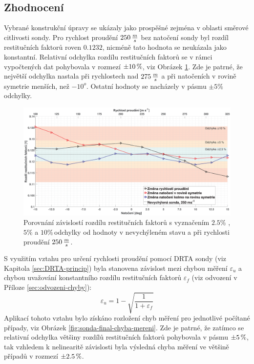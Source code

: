         \newpage
        \subsection{Zhodnocení}

            Vybrané konstrukční úpravy se ukázaly jako prospěšné zejména v oblasti směrové citlivosti sondy. Pro rychlost proudění $250 \, \frac{m}{s}$ bez natočení sondy byl rozdíl restitučních faktorů roven $0.1232$, nicméně tato hodnota se neukázala jako konstantní. Relativní odchylka rozdílu restitučních faktorů se v rámci vypočtených dat pohybovala v rozmezí $\pm10 \, \%$, viz Obrázek \ref{fig:sonda-final-rozdil-restitucnich-faktoru}. Zde je patrné, že největší odchylka nastala při rychlostech nad $275 \, \frac{m}{s}$ a při natočeních v rovině symetrie menších, než $-10^o$. Ostatní hodnoty se nacházely v pásmu $\pm5\%$ odchylky.

            \begin{figure}[ht!]
                \centering
                \includegraphics*[width=\textwidth]{500_FINAL/final_rozdil_restitucnich_faktoru.eps}
                \caption{Porovnání závislostí rozdílu restitučních faktorů s vyznačením $2.5\%$ ,$5\%$ \linebreak a $10\%$\,odchylky od hodnoty v nevychýleném stavu a při rychlosti proudění $250 \, \frac{m}{s}$.}
                \label{fig:sonda-final-rozdil-restitucnich-faktoru}
            \end{figure}

            

            S využitím vztahu pro určení rychlosti proudění pomocí DRTA sondy (viz \linebreak Kapitola \ref{sec:DRTA-princip}) byla stanovena závislost mezi chybou měření $\varepsilon _u$ a chybou uvažování konstantního rozdílu restitučních faktorů $\varepsilon _f$ (viz odvození v Příloze \ref{sec:odvozeni-chyby}):
            \begin{equation} \label{eq:chyba-mereni}
                \varepsilon _u = 1 - \sqrt{\frac{1}{1 + \varepsilon _f}}
            \end{equation}
            Aplikací tohoto vztahu bylo získáno rozložení chyb měření pro jednotlivé počítané případy, viz Obrázek \ref{fig:sonda-final-chyba-mereni}. Zde je patrné, že zatímco se relativní odchylka většiny rozdílů restitučních faktorů pohybovala v pásmu $\pm5 \, \%$, tak vzhledem k nelinearitě závislosti byla výsledná chyba měření ve většině případů v rozmezí $\pm2.5 \, \%$. 

